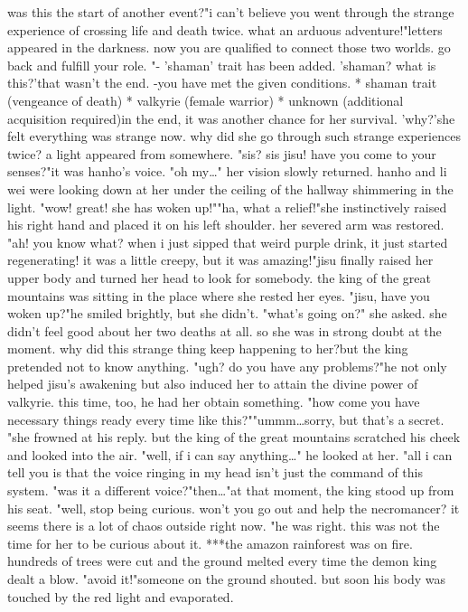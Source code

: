 was this the start of another event?"i can't believe you went through the strange experience of crossing life and death twice.
 what an arduous adventure!"letters appeared in the darkness.
 now you are qualified to connect those two worlds.
 go back and fulfill your role.
"- 'shaman' trait has been added.
'shaman? what is this?'that wasn't the end.
-you have met the given conditions.
* shaman trait (vengeance of death) * valkyrie (female warrior) * unknown (additional acquisition required)in the end, it was another chance for her survival.
'why?'she felt everything was strange now.
 why did she go through such strange experiences twice?
a light appeared from somewhere.
"sis? sis jisu! have you come to your senses?"it was hanho's voice.
"oh my…" her vision slowly returned.
hanho and li wei were looking down at her under the ceiling of the hallway shimmering in the light.
"wow! great! she has woken up!""ha, what a relief!"she instinctively raised his right hand and placed it on his left shoulder.
her severed arm was restored.
"ah! you know what? when i just sipped that weird purple drink, it just started regenerating! it was a little creepy, but it was amazing!"jisu finally raised her upper body and turned her head to look for somebody.
the king of the great mountains was sitting in the place where she rested her eyes.
"jisu, have you woken up?"he smiled brightly, but she didn't.
"what's going on?" she asked.
she didn't feel good about her two deaths at all.
 so she was in strong doubt at the moment.
 why did this strange thing keep happening to her?but the king pretended not to know anything.
"ugh? do you have any problems?"he not only helped jisu's awakening but also induced her to attain the divine power of valkyrie.
 this time, too, he had her obtain something.
"how come you have necessary things ready every time like this?""ummm…sorry, but that's a secret.
"she frowned at his reply.
 but the king of the great mountains scratched his cheek and looked into the air.
"well, if i can say anything…" he looked at her.
 "all i can tell you is that the voice ringing in my head isn't just the command of this system.
"was it a different voice?"then…"at that moment, the king stood up from his seat.
"well, stop being curious.
 won't you go out and help the necromancer? it seems there is a lot of chaos outside right now.
"he was right.
 this was not the time for her to be curious about it.
***the amazon rainforest was on fire.
hundreds of trees were cut and the ground melted every time the demon king dealt a blow.
"avoid it!"someone on the ground shouted.
 but soon his body was touched by the red light and evaporated.
